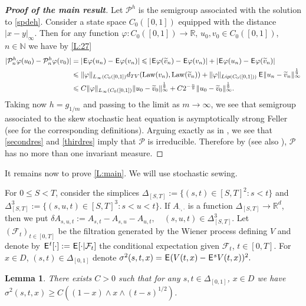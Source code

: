 \documentclass[12pt]{article}
\newtheorem{lemma}[theorem]{Lemma}
\theoremstyle{definition}
\DeclareMathOperator{\1}{\mathbbm{1}}%
\DeclareMathOperator{\law}{Law}%
\def\E{\hskip.15ex\mathsf{E}\hskip.10ex}
\def\phi{\varphi}
\renewcommand{\ge}{\geqslant}
\renewcommand{\le}{\leqslant}
\newcommand{\dis}{\infty}
\newcommand{\wt}{\widetilde}
\newcommand{\F}{\mathcal{F}}
\newcommand{\N}{\mathbb{N}}
\newcommand{\PP}{\mathcal{P}}
\newcommand{\R}{\mathbb{R}}
\begin{document}
\begin{proof}[\textbf{Proof of the main result}]
Let $\PP^h$ is the semigroup associated with the solution to
\eqref{spdeh}. Consider a state space $C_0([0,1])$ equipped with the
distance $|x-y|_\infty$.
Then for any function $\phi: C_0([0,1])\to\R$, $u_0,v_0\in C_0([0,1])$, $n\in \N$ we have by \cref{L:27}
\begin{align*}	
|\mathcal{P}^h_n \phi(u_0)-\mathcal{P}^h_n \phi(v_0)|& = |\E \phi(u_n)-\E \phi(v_n)|\le
|\E \phi(\wt v_n)-\E \phi(v_n)|+ |\E \phi(u_n)-\E \phi(\wt v_n)|\\
&\le \|\phi\|_{L_\infty(C_0([0,1])} d_{TV}(\law(v_n),\law(\wt v_n))+\|\phi\|_{Lip(C_0([0,1]))}\,\E \|u_n-\wt v_n\|^{\frac19}_{\dis}\\
&\le C  \|\phi\|_{L_\infty(C_0([0,1])}\|u_0-\wt v_0\|^{\frac19}_{\dis}+ C 2^{-\frac{n}9}\|u_0-\wt v_0\|^{\frac19}_{\dis}.
\end{align*}
Taking now $h=g_{1/m}$ and passing to the limit as $m\to\infty$, we see that semigroup associated to the skew stochastic heat equation is asymptotically strong Feller (see \cite{HM06} for the corresponding definitions). Arguing exactly as in \cite[proof of Theorem 2.7]{BW20}, we see that \eqref{secondres} and \eqref{thirdres} imply that $\PP$ is  irreducible. Therefore by \cite[Corollary 3.17]{HM06} (see also \cite[Theorem 2.8]{BW20}), $\PP$ has no more than one invariant measure.
\end{proof}

It remains now to prove \cref{L:main}. We will use stochastic sewing.

For $0 \le S < T$, consider the simplices 
$\Delta_{[S,T]}:=\{(s,t)\in[S,T]^2\colon s< t\}$ and $\Delta^3_{[S,T]}:=\{(s,u,t)\in[S,T]^3\colon s< u< t\}$. 
If $A_{\cdot,\cdot}$ is a function $\Delta_{[S,T]}\to\R^d$, then we put 
$\delta A_{s,u,t}:= A_{s,t}-A_{s,u}-A_{u,t},\quad  (s,u,t)\in\Delta^3_{[S,T]}$. 
Let $(\F_t)_{t\in[0,T]}$ be the filtration generated by the Wiener
process defining $V$ and denote by  $\E^t[\cdot]:=\E[\cdot|\F_t]$ the conditional expectation given $\F_t$, $t\in[0,T]$. For $x\in D$, $(s,t)\in\Delta_{[0,1]}$ denote
$
\sigma^2(s,t,x)=\E (V(t,x)-\E^s V(t,x))^2.
$

\begin{lemma}\label{L:fkb} There exists $C>0$ such that for any $s,t\in\Delta_{[0,1]}$, $x\in D$ we have 
$\sigma^2(s,t,x)\ge  C ((1-x)\wedge x \wedge (t-s)^{1/2})$.
\end{lemma}
\end{document}
